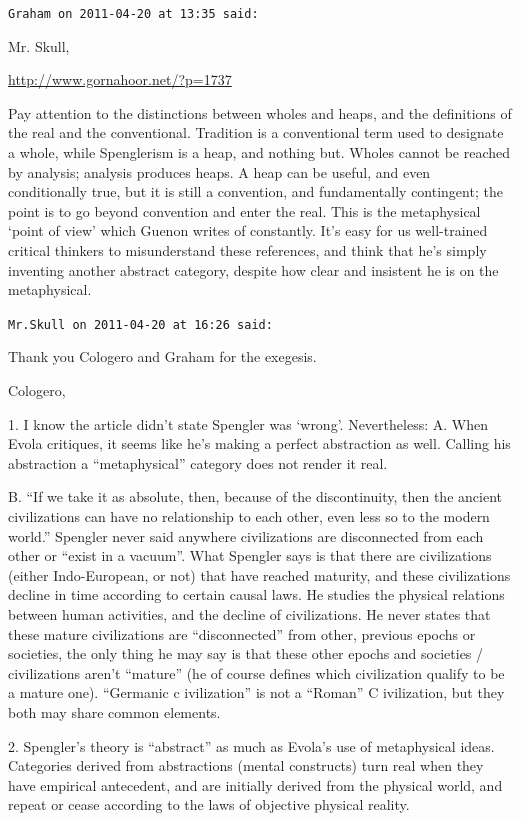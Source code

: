 \begin{footnotesize}
\begin{sffamily}
\hfill

\texttt{Graham on 2011-04-20 at 13:35 said:}

Mr. Skull,

\url{http://www.gornahoor.net/?p=1737}


Pay attention to the distinctions between wholes and heaps, and the definitions of the real and the conventional. Tradition is a conventional term used to designate a whole, while Spenglerism is a heap, and nothing but. Wholes cannot be reached by analysis; analysis produces heaps. A heap can be useful, and even conditionally true, but it is still a convention, and fundamentally contingent; the point is to go beyond convention and enter the real. This is the metaphysical `point of view' which Guenon writes of constantly. It's easy for us well-trained critical thinkers to misunderstand these references, and think that he's simply inventing another abstract category, despite how clear and insistent he is on the metaphysical.

\hfill

\texttt{Mr.Skull on 2011-04-20 at 16:26 said:}

Thank you Cologero and Graham for the exegesis.

Cologero,

1. I know the article didn't state Spengler was `wrong'. Nevertheless: A. When Evola critiques, it seems like he's making a perfect abstraction as well. Calling his abstraction a ``metaphysical'' category does not render it real.

B. ``If we take it as absolute, then, because of the discontinuity, then the ancient civilizations can have no relationship to each other, even less so to the modern world.'' Spengler never said anywhere civilizations are disconnected from each other or ``exist in a vacuum''. What Spengler says is that there are civilizations (either Indo-European, or not) that have reached maturity, and these civilizations decline in time according to certain causal laws. He studies the physical relations between human activities, and the decline of civilizations. He never states that these mature civilizations are ``disconnected'' from other, previous epochs or societies, the only thing he may say is that these other epochs and societies / civilizations aren't ``mature'' (he of course defines which civilization qualify to be a mature one). ``Germanic c ivilization'' is not a ``Roman'' C ivilization, but they both may share common elements.

2. Spengler's theory is ``abstract'' as much as Evola's use of metaphysical ideas. Categories derived from abstractions (mental constructs) turn real when they have empirical antecedent, and are initially derived from the physical world, and repeat or cease according to the laws of objective physical reality.


\end{sffamily}
\end{footnotesize}
